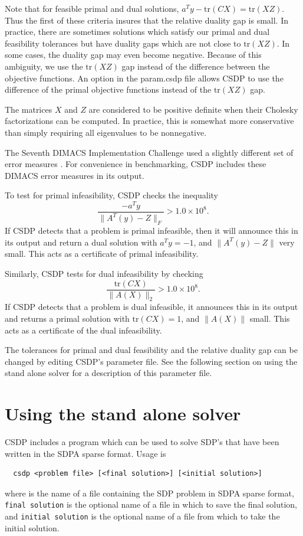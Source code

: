 \documentclass{article}
\begin{document}
Note that for feasible primal and dual solutions,
$a^Ty-\mbox{tr}(CX)=\mbox{tr}(XZ)$.  Thus the first of these criteria insures
that the relative duality gap is small.  In practice, there are
sometimes solutions which satisfy our primal and dual feasibility
tolerances but have duality gaps which are not close to
$\mbox{tr}(XZ)$.  In some cases, the duality gap may even become
negative.  Because of this ambiguity, we use the $\mbox{tr}(XZ)$ gap
instead of the difference between the objective functions.  An option
in the param.csdp file allows CSDP to use the difference of the primal
objective functions instead of the $\mbox{tr}(XZ)$ gap.

The matrices $X$ and $Z$ are considered to be positive definite when
their Cholesky factorizations can be computed.  In practice, this is
somewhat more conservative than simply requiring all eigenvalues to be
nonnegative.

The Seventh DIMACS Implementation Challenge used a slightly different
set of error measures \cite{MittelmannHD:AnibS}.  For convenience in
benchmarking, CSDP includes these DIMACS error measures in its
output.  

To test for primal infeasibility, CSDP checks the inequality
\begin{equation}
\frac{-a^{T}y}{\| A^{T}(y)-Z \|_{F}} > 1.0 \times 10^8.
\end{equation}
If CSDP detects that a problem is primal infeasible, then it will announce
this in its output and return a dual solution with $a^{T}y=-1$, and 
$\| A^{T}(y)-Z \|$ very small.  This acts as a certificate of primal 
infeasibility.  

Similarly, CSDP tests for dual infeasibility by checking
\begin{equation}
  \frac{\mbox{tr}(CX)}{\| A(X) \|_{2}} > 1.0 \times 10^8.
\end{equation}
If CSDP detects that a problem is dual 
infeasible, it announces this in its output and returns a primal 
solution with $\mbox{tr}(CX)=1$, and $\| A(X)\|$ small.  This acts
as a certificate of the dual infeasibility.  

The tolerances for primal and dual feasibility and the relative duality
gap can be changed by editing CSDP's parameter file.  See the 
following section on using the stand alone solver for a description of
this parameter file.

\section*{Using the stand alone solver}
CSDP includes a program which can be used to solve SDP's that have
been written in the SDPA sparse format.   Usage is  
\begin{verbatim}
  csdp <problem file> [<final solution>] [<initial solution>]
\end{verbatim}
where {\tt <problem file>} is the name of a file containing the SDP
problem in SDPA sparse format, {\tt final solution} is the optional
name of a file in which to save the final solution, and {\tt initial
solution} is the optional name of a file from which to take the
initial solution.
\end{document}
